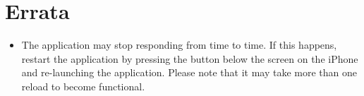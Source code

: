 \documentclass[12pt,letterpaper]{article}
\begin{document}
\section{Errata}
\begin{itemize}
\item The application may stop responding from time to time. If this happens, restart the application by pressing the button below the screen on the iPhone and re-launching the application. Please note that it may take more than one reload to become functional.
\end{itemize}
\end{document}
